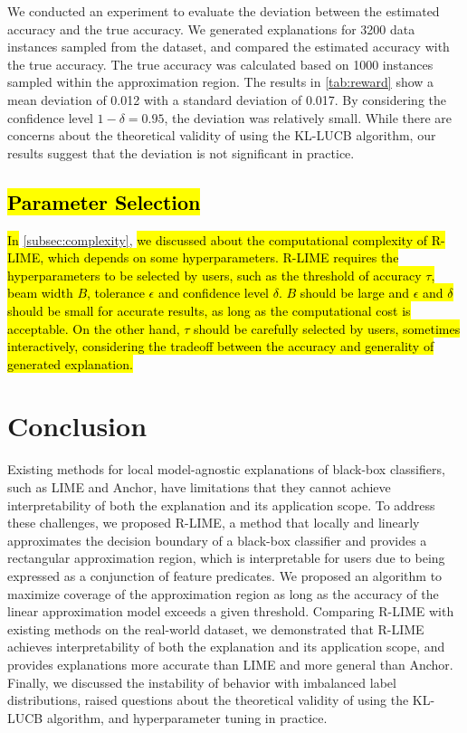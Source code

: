 \documentclass[runningheads]{llncs}
\begin{document}
{We conducted an experiment to evaluate the deviation
between the estimated accuracy and the true accuracy.
We generated explanations for 3200 data instances sampled from the dataset,
and compared the estimated accuracy with the true accuracy.
The true accuracy was calculated based on 1000 instances sampled
within the approximation region.
The results in \cref{tab:reward} show a mean deviation of 0.012
with a standard deviation of 0.017.
By considering the confidence level $1-\delta=0.95$,
the deviation was relatively small.
While there are concerns about the theoretical validity of using the KL-LUCB algorithm,
our results suggest that the deviation is not significant in practice.

\subsection{\hl{Parameter Selection}}\label{sec:param}

\hl{In} \cref{subsec:complexity},
\hl{%
  we discussed about the computational complexity of R-LIME,
  which depends on some hyperparameters.
  R-LIME requires the hyperparameters to be selected by users,
  such as the threshold of accuracy $\tau$, beam width $B$, tolerance $\epsilon$
  and confidence level $\delta$.
  $B$ should be large and $\epsilon$ and $\delta$ should be small for
  accurate results, as long as the computational cost is acceptable.
  On the other hand, $\tau$ should be carefully selected by users,
  sometimes interactively, considering the tradeoff between
  the accuracy and generality of generated explanation.
}

\section{Conclusion}
Existing methods for
local model-agnostic explanations of black-box classifiers,
such as LIME and Anchor,
have limitations that they cannot achieve interpretability of
both the explanation and its application scope.
To address these challenges,
we proposed R-LIME,
a method that locally and linearly approximates the decision boundary
of a black-box classifier and provides a rectangular approximation region,
which is interpretable for users due to being expressed as a conjunction of feature predicates.
We proposed an algorithm to
maximize coverage of the approximation region
as long as the accuracy of the linear approximation model exceeds a given threshold.
Comparing R-LIME with existing methods on the real-world dataset,
we demonstrated that R-LIME achieves interpretability of both the explanation
and its application scope,
and provides explanations more accurate than LIME and more general than Anchor.
Finally,
we discussed the instability of behavior with imbalanced label distributions,
raised questions about the theoretical validity of using the KL-LUCB algorithm,
and hyperparameter tuning in practice.

\newpage


}

\newpage
\setcounter{page}{1}
\paper{}
\renewcommand{\hl}[1]{#1}
\newpage
\setcounter{page}{1}
\paper{}
\end{document}
